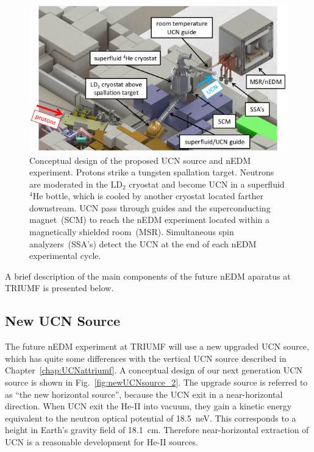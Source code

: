 \begin{figure}[h!]
  \centering
  \includegraphics[width=1.0\textwidth]{edmtriumf.png}
  \caption{Conceptual design of the proposed UCN source and nEDM
    experiment. Protons strike a tungsten spallation target. Neutrons
    are moderated in the LD$_2$ cryostat and become UCN in a
    superfluid $^4$He bottle, which is cooled by another cryostat
    located farther downstream. UCN pass through guides and the
    superconducting magnet~(SCM) to reach the nEDM experiment located
    within a magnetically shielded room~(MSR). Simultaneous spin
    analyzers~(SSA’s) detect the UCN at the end of each nEDM
    experimental cycle.  }
  \label{fig:triumfEDM}
\end{figure}

A brief description of the main components of the future nEDM aparatus
at TRIUMF is presented below.

\subsection{New UCN Source\label{sec:newUCNsource}}


The future nEDM experiment at TRIUMF will use a new upgraded UCN
source, which has quite some differences with the vertical UCN source
described in Chapter~\ref{chap:UCNattriumf}. A conceptual design of
our next generation UCN source is shown in
Fig.~\ref{fig:newUCNsource_2}. The upgrade source is referred to as
``the new horizontal source'', because the UCN exit in a
near-horizontal direction. When UCN exit the He-II into vacuum, they
gain a kinetic energy equivalent to the neutron optical potential of
18.5~neV. This corresponds to a height in Earth’s gravity field of
18.1~cm. Therefore near-horizontal extraction of UCN is a reasonable
development for He-II sources.


